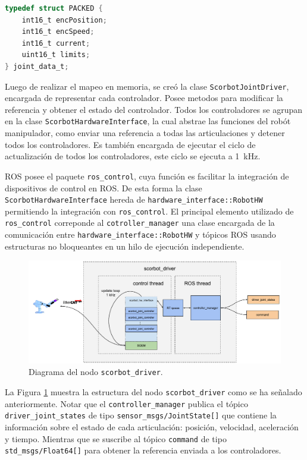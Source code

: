 \begin{description}
\begin{lstlisting}[language=C,style=csstyle, caption=Estructuras de datos usadas para mapear datos de dispositivos esclavos, label=cap4_estructuras]
typedef struct PACKED {
    int16_t encPosition;
    int16_t encSpeed;
    int16_t current;
    uint16_t limits;
} joint_data_t;
\end{lstlisting}

Luego de realizar el mapeo en memoria, se creó la clase \texttt{ScorbotJointDriver}, encargada de representar cada controlador. Posee metodos para modificar la referencia y obtener el estado del controlador. Todos los controladores se agrupan en la clase \texttt{ScorbotHardwareInterface}, la cual abstrae las funciones del robót manipulador, como enviar una referencia a todas las articulaciones y detener todos los controladores. Es también encargada de ejecutar el ciclo de actualización de todos los controladores, este ciclo se ejecuta a \SI{1}{\kilo\hertz}.

ROS posee el paquete \texttt{ros\_control}, cuya función es facilitar la integración de dispositivos de control en ROS. De esta forma la clase \texttt{ScorbotHardwareInterface} hereda de \texttt{hardware\_interface::RobotHW} permitiendo la integración con \texttt{ros\_control}. El principal elemento utilizado de \texttt{ros\_control} correponde al \texttt{cotroller\_manager} una clase encargada de la comunicación entre \texttt{hardware\_interface::RobotHW} y tópicos ROS usando estructuras no bloqueantes en un hilo de ejecución independiente.

\begin{figure}[ht]
  \centering
  \includegraphics[width=\textwidth]{img/cap4/scorbot_driver.pdf}
  \caption{Diagrama del nodo \texttt{scorbot\_driver}.}
  \label{cap4_scorbot_driver}
\end{figure}

La Figura \ref{cap4_scorbot_driver} muestra la estructura del nodo \texttt{scorbot\_driver} como se ha señalado anteriormente. Notar que el \texttt{controller\_manager} publica el tópico \texttt{driver\_joint\_states} de tipo \texttt{sensor\_msgs/JointState[]} que contiene la información sobre el estado de cada articulación: posición, velocidad, aceleración y tiempo. Mientras que se suscribe al tópico \texttt{command} de tipo \texttt{std\_msgs/Float64[]} para obtener la referencia enviada a los controladores.


\end{description}
